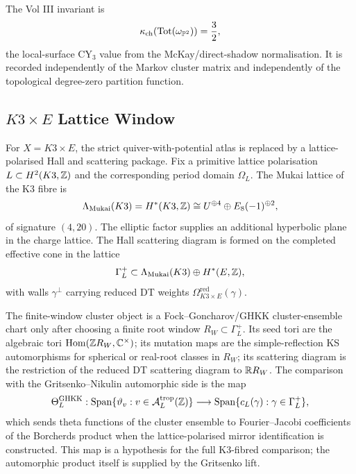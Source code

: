 The Vol III invariant is
\[
  \kappa_{\mathrm{ch}}(\mathrm{Tot}(\omega_{\mathbb{P}^2}))=\frac32,
\]
the local-surface CY$_3$ value from the McKay/direct-shadow
normalisation. It is recorded independently of the Markov cluster
matrix and independently of the topological degree-zero partition
function.

\subsection*{\texorpdfstring{$K3\times E$}{K3 x E} Lattice Window}
\label{sec:k3e-lattice-window}

For $X=K3\times E$, the strict quiver-with-potential atlas is replaced
by a lattice-polarised Hall and scattering package. Fix a primitive
lattice polarisation $L\subset H^2(K3,\mathbb{Z})$ and the corresponding period
domain $\Omega_L$. The Mukai lattice of the K3 fibre is
\[
  \Lambda_{\mathrm{Mukai}}(K3)
  =
  H^*(K3,\mathbb{Z})
  \cong U^{\oplus4}\oplus E_8(-1)^{\oplus2},
\]
of signature $(4,20)$. The elliptic factor supplies an additional
hyperbolic plane in the charge lattice. The Hall scattering diagram is
formed on the completed effective cone in the lattice
\[
  \Gamma_L^+
  \subset
  \Lambda_{\mathrm{Mukai}}(K3)\oplus H^*(E,\mathbb{Z}),
\]
with walls $\gamma^\perp$ carrying reduced DT weights
$\Omega^{\mathrm{red}}_{K3\times E}(\gamma)$.

The finite-window cluster object is a Fock--Goncharov/GHKK
cluster-ensemble chart only after choosing a finite root window
$R_W\subset \Gamma_L^+$. Its seed tori are the algebraic tori
$\mathrm{Hom}(\mathbb{Z} R_W,\mathbb{C}^\times)$; its mutation maps are the simple-reflection
KS automorphisms for spherical or real-root classes in $R_W$; its
scattering diagram is the restriction of the reduced DT scattering
diagram to $\mathbb{R} R_W$. The comparison with the Gritsenko--Nikulin
automorphic side is the map
\[
  \Theta_L^{\mathrm{GHKK}}
  :
  \mathrm{Span}\{\vartheta_v:v\in \mathcal{A}_L^{\mathrm{trop}}(\mathbb{Z})\}
  \longrightarrow
  \mathrm{Span}\{c_L(\gamma):\gamma\in\Gamma_L^+\},
\]
which sends theta functions of the cluster ensemble to Fourier--Jacobi
coefficients of the Borcherds product when the lattice-polarised mirror
identification is constructed. This map is a hypothesis for the full
K3-fibred comparison; the automorphic product itself is supplied by the
Gritsenko lift.

